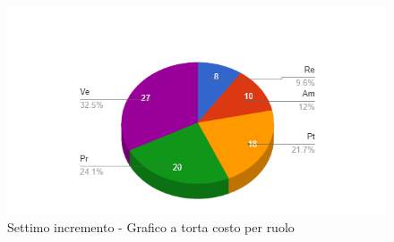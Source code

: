 {{\begin{longtable}{C{.4\freewidth} C{.2\freewidth} C{.2\freewidth} C{.2\freewidth} C{.2\freewidth} C{.2\freewidth} C{.2\freewidth} C{.2\freewidth} C{.2\freewidth}}
        \end{longtable}

        \begin{figure}[H]
          \includegraphics[width=15cm]{sezioni/images/settimoT.png}
          \centering
          \caption{Settimo incremento - Grafico a torta costo per ruolo}
       \end{figure}
    }
    }

